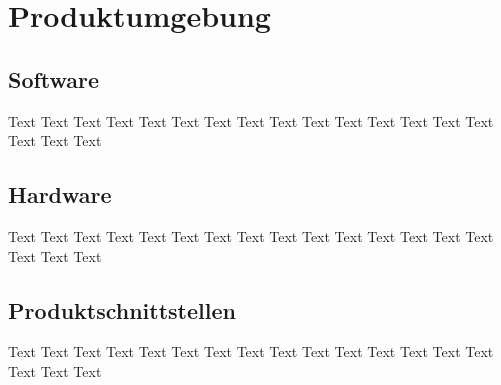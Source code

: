 \chapter{Produktumgebung}
\section{Software}
Text Text Text Text Text Text Text Text Text Text Text Text Text Text Text Text Text Text
\section{Hardware}
Text Text Text Text Text Text Text Text Text Text Text Text Text Text Text Text Text Text
\section{Produktschnittstellen}
Text Text Text Text Text Text Text Text Text Text Text Text Text Text Text Text Text Text